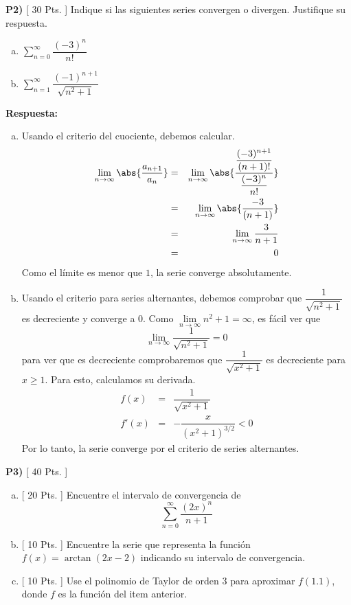 \documentclass{article}
\begin{document}
\newpage
\noindent\textbf{P2) }\textsf{[ 30 Pts. ] } Indique si las siguientes series convergen o divergen. Justifique su respuesta.
\begin{enumerate}[a)]
  \item $\displaystyle\sum_{n=0}^{\infty}\dfrac{(-3)^n}{n!}$
  \item $\displaystyle\sum_{n=1}^{\infty}\dfrac{(-1)^{n+1}}{\sqrt{n^2+1}}$
\end{enumerate}


\vspace{0.25cm}
\noindent\textbf{Respuesta:} 
\begin{enumerate}[a)]
  \item Usando el criterio del cuociente, debemos calcular.
    \begin{eqnarray*}
      \lim_{n\to\infty}\abs{\dfrac{a_{n+1}}{a_n}}
        &=& \lim_{n\to\infty}\abs{\dfrac{\dfrac{(-3)^{n+1}}{(n+1)!}}{\dfrac{(-3)^n}{n!}}}\\
        &=& \lim_{n\to\infty}\abs{\dfrac{-3}{(n+1)}}\\
        &=& \lim_{n\to\infty}\dfrac{3}{n+1}\\
        &=& 0
    \end{eqnarray*}
    Como el límite es menor que $1$, la serie converge absolutamente.
  \item Usando el criterio para series alternantes, debemos comprobar que $\dfrac{1}{\sqrt{n^2+1}}$ es decreciente y converge a $0$. Como $\lim\limits_{n\to\infty}n^2+1=\infty$, es fácil ver que
    $$\lim_{n\to\infty}\dfrac{1}{\sqrt{n^2+1}}=0$$
  para ver que es decreciente comprobaremos que $\dfrac{1}{\sqrt{x^2+1}}$ es decreciente para $x\geq 1$. Para esto, calculamos su derivada.
    \begin{eqnarray*}
      f(x) &=& \dfrac{1}{\sqrt{x^2+1}}\\
      f'(x) &=& -\dfrac{x}{(x^2+1)^{3/2}}<0
    \end{eqnarray*}
    Por lo tanto, la serie converge por el criterio de series alternantes.
\end{enumerate}


\newpage
\noindent\textbf{P3) }\textsf{[ 40 Pts. ] } 
\begin{enumerate}[a)]
  \item \textsf{[ 20 Pts. ] }Encuentre el intervalo de convergencia de
    $$\sum_{n=0}^{\infty}\dfrac{(2x)^n}{n+1}$$
  \item \textsf{[ 10 Pts. ] }Encuentre la serie que representa la función $f(x)=\arctan(2x-2)$ indicando su intervalo de convergencia.
  \item \textsf{[ 10 Pts. ] }Use el polinomio de Taylor de orden 3 para aproximar $f(1.1)$, donde $f$ es la función del item anterior.
\end{enumerate}
\end{document}
